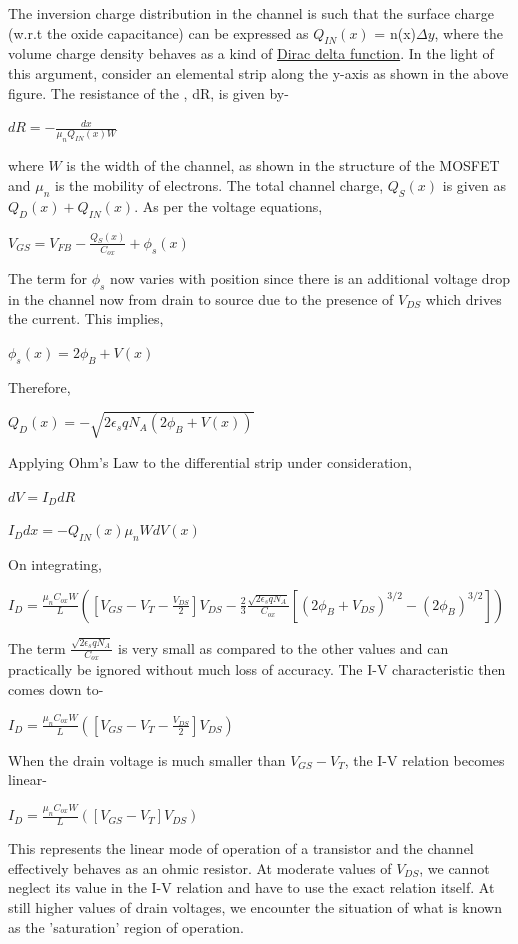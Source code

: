\documentclass[12 pt]{article}
\begin{document}
The inversion charge distribution in the channel is such that the surface charge (w.r.t the oxide capacitance) can be expressed as $Q_{IN}(x)$ = n(x)$\Delta y$, where the volume charge density behaves as a kind of \href{https://en.wikipedia.org/wiki/Dirac_delta_function}{Dirac delta function}. In the light of this argument, consider an elemental strip along the y-axis as shown in the above figure. The resistance of the , dR, is given by-
\begin{center}
    $dR = -\frac{dx}{\mu_{n}Q_{IN}(x)W}$
\end{center}
where $W$ is the width of the channel, as shown in the structure of the MOSFET and $\mu_{n}$ is the mobility of electrons. The total channel charge, $Q_{S}(x)$ is given as $Q_{D}(x) + Q_{IN}(x)$. As per the voltage equations, 
\begin{center}
    $ V_{GS} = V_{FB} - \frac{Q_{S}(x)}{C_{ox}} + \phi_{s}(x) $
\end{center}
The term for $\phi_{s}$ now varies with position since there is an additional voltage drop in the channel now from drain to source due to the presence of $V_{DS}$ which drives the current. This implies,
\begin{center}
    $\phi_{s}(x) = 2\phi_{B} + V(x)$
\end{center}
Therefore, 
\begin{center}
    $ Q_{D}(x) = -\sqrt{2\epsilon_{s}qN_{A}(2\phi_{B}+V(x))}$
\end{center}
Applying Ohm's Law to the differential strip under consideration,
\begin{center}
    $ dV = I_{D}dR$
\end{center}
\begin{center}
    $I_{D}dx = -Q_{IN}(x)\mu_{n}WdV(x)$
\end{center}
On integrating,
\begin{center}
    $I_{D} = \frac{\mu_{n}C_{ox}W}{L}([V_{GS}-V_{T}-\frac{V_{DS}}{2}]V_{DS} -  \frac{2}{3}\frac{\sqrt{2\epsilon_{s}qN_{A}}}{C_{ox}}[(2\phi_{B}+V_{DS})^{3/2}-(2\phi_{B})^{3/2}])$
\end{center}

The term $\frac{\sqrt{2\epsilon_{s}qN_{A}}}{C_{ox}}$ is very small as compared to the other values and can practically be ignored without much loss of accuracy. The I-V characteristic then comes down to-
\begin{center}
    $I_{D} = \frac{\mu_{n}C_{ox}W}{L}([V_{GS}-V_{T}-\frac{V_{DS}}{2}]V_{DS})$
\end{center}
When the drain voltage is much smaller than $V_{GS}-V_{T}$, the I-V relation becomes linear-
\begin{center}
    $I_{D} = \frac{\mu_{n}C_{ox}W}{L}([V_{GS}-V_{T}]V_{DS}) $
\end{center}
This represents the linear mode of operation of a transistor and the channel effectively behaves as an ohmic resistor. At moderate values of $V_{DS}$, we cannot neglect its value in the I-V relation and have to use the exact relation itself. At still higher values of drain voltages, we encounter the situation of what is known as the 'saturation' region of operation. 
\end{document}

